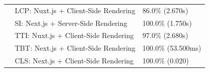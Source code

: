 \begin{table}[H]
{\begin{tabular}{|l|l|l|}
                                & LCP: Nuxt.js + Client-Side Rendering         & 86.0\% (2.670s)    \\[0.2em]
                                & SI: Next.js + Server-Side Rendering          & 100.0\% (1.750s)   \\[0.2em]
                                & TTI: Nuxt.js + Client-Side Rendering         & 97.0\% (2.680s)    \\[0.2em]
                                & TBT: Next.js + Client-Side Rendering         & 100.0\% (53.500ms) \\[0.2em]
                                & CLS: Next.js + Client-Side Rendering         & 100.0\% (0.020)    \\
            \hline
        \end{tabular}%
    }
\end{table}

